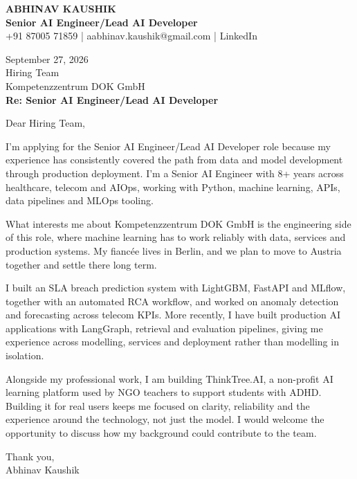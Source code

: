 \documentclass[10pt,a4paper]{article}
\begin{document}
\begin{center}
{\Large\bfseries ABHINAV KAUSHIK}\\[2pt]
{\bfseries Senior AI Engineer/Lead AI Developer}\\[2pt]
+91 87005 71859 \quad | \quad aabhinav.kaushik@gmail.com \quad | \quad LinkedIn
\end{center}
\vspace{8pt}
September 27, 2026\\[6pt]
Hiring Team\\
Kompetenzzentrum DOK GmbH\\[4pt]
\textbf{Re: Senior AI Engineer/Lead AI Developer}

Dear Hiring Team,

I’m applying for the Senior AI Engineer/Lead AI Developer role because my experience has consistently covered the path from data and model development through production deployment. I’m a Senior AI Engineer with 8+ years across healthcare, telecom and AIOps, working with Python, machine learning, APIs, data pipelines and MLOps tooling.

What interests me about Kompetenzzentrum DOK GmbH is the engineering side of this role, where machine learning has to work reliably with data, services and production systems. My fiancée lives in Berlin, and we plan to move to Austria together and settle there long term.

I built an SLA breach prediction system with LightGBM, FastAPI and MLflow, together with an automated RCA workflow, and worked on anomaly detection and forecasting across telecom KPIs. More recently, I have built production AI applications with LangGraph, retrieval and evaluation pipelines, giving me experience across modelling, services and deployment rather than modelling in isolation.

Alongside my professional work, I am building ThinkTree.AI, a non-profit AI learning platform used by NGO teachers to support students with ADHD. Building it for real users keeps me focused on clarity, reliability and the experience around the technology, not just the model. I would welcome the opportunity to discuss how my background could contribute to the team.

Thank you,\\
Abhinav Kaushik
\end{document}
